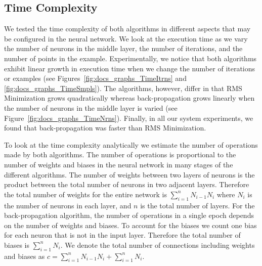 \documentclass[11pt]{article}
\begin{document}
\subsection{Time Complexity} %
\label{sub:time_complexity}

We tested the time complexity of both algorithms in different aspects that may be configured in the neural network. We look at the
execution time as we vary the number of neurons in the middle layer, the number of iterations, and the number of points in the example.
Experimentally, we notice that both algorithms exhibit linear growth in execution time when we change the number of iterations or
examples (see Figures~\ref{fig:docs_graphs_TimeItrns} and \ref{fig:docs_graphs_TimeSmpls}). The algorithms, however, differ in that RMS
Minimization grows quadratically whereas back-propagation grows linearly when the number of neurons in the middle layer is varied (see
Figure~\ref{fig:docs_graphs_TimeNrns}). Finally, in all our system experiments, we found that back-propagation was faster than RMS
Minimization.

To look at the time complexity analytically we estimate the number of operations made by both algorithms. The number of operations is
proportional to the number of weights and biases in the neural network in many stages of the different algorithms. The number of weights
between two layers of neurons is the product between the total number of neurons in two adjacent layers. Therefore the total number of
weights for the entire network is $\sum_{i=1}^{n}N_{i-1}N_{i}$ where $N_{i}$ is the number of neurons in each layer, and $n$ is the
total number of layers. For the back-propagation algorithm, the number of operations in a single epoch depends on the number of weights
and biases. To account for the biases we count one bias for each neuron that is not in the input layer. Therefore the total number of
biases is $\sum_{i=1}^{n}N_{i}$. We denote the total number of connections including weights and biases as
$c=\sum_{i=1}^{n}N_{i-1}N_{i} + \sum_{i=1}^{n}N_{i}$.
\end{document}
